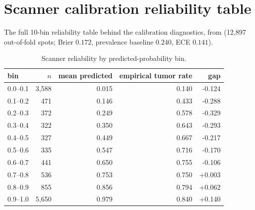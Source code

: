 \section{Scanner calibration reliability table}
{\sloppy The full 10-bin reliability table behind the calibration diagnostics, from  (12{,}897 out-of-fold spots; Brier $0.172$, prevalence baseline $0.240$, ECE $0.141$).\par}
\begin{table}[h]\centering\small\caption{Scanner reliability by predicted-probability bin.}\label{tab:reliability}
\begin{tabular}{lrrrr}\hline\hline bin & $n$ & mean predicted & empirical tumor rate & gap\\\hline
0.0--0.1 & 3,588 & 0.015 & 0.140 & -0.124\\
0.1--0.2 & 471 & 0.146 & 0.433 & -0.288\\
0.2--0.3 & 372 & 0.249 & 0.578 & -0.329\\
0.3--0.4 & 322 & 0.350 & 0.643 & -0.293\\
0.4--0.5 & 327 & 0.449 & 0.667 & -0.217\\
0.5--0.6 & 335 & 0.547 & 0.716 & -0.170\\
0.6--0.7 & 441 & 0.650 & 0.755 & -0.106\\
0.7--0.8 & 536 & 0.753 & 0.750 & +0.003\\
0.8--0.9 & 855 & 0.856 & 0.794 & +0.062\\
0.9--1.0 & 5,650 & 0.979 & 0.840 & +0.140\\
\hline\end{tabular}\end{table}

